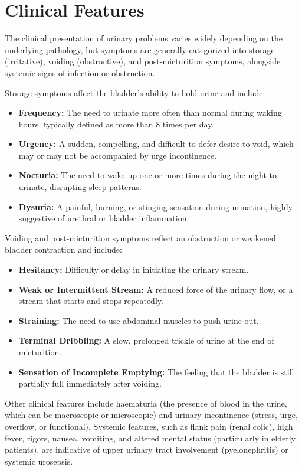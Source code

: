 \section*{Clinical Features}
The clinical presentation of urinary problems varies widely depending on the underlying pathology, but symptoms are generally categorized into storage (irritative), voiding (obstructive), and post-micturition symptoms, alongside systemic signs of infection or obstruction.

Storage symptoms affect the bladder's ability to hold urine and include:
\begin{itemize}
    \item \textbf{Frequency:} The need to urinate more often than normal during waking hours, typically defined as more than 8 times per day.
    \item \textbf{Urgency:} A sudden, compelling, and difficult-to-defer desire to void, which may or may not be accompanied by urge incontinence.
    \item \textbf{Nocturia:} The need to wake up one or more times during the night to urinate, disrupting sleep patterns.
    \item \textbf{Dysuria:} A painful, burning, or stinging sensation during urination, highly suggestive of urethral or bladder inflammation.
\end{itemize}

Voiding and post-micturition symptoms reflect an obstruction or weakened bladder contraction and include:
\begin{itemize}
    \item \textbf{Hesitancy:} Difficulty or delay in initiating the urinary stream.
    \item \textbf{Weak or Intermittent Stream:} A reduced force of the urinary flow, or a stream that starts and stops repeatedly.
    \item \textbf{Straining:} The need to use abdominal muscles to push urine out.
    \item \textbf{Terminal Dribbling:} A slow, prolonged trickle of urine at the end of micturition.
    \item \textbf{Sensation of Incomplete Emptying:} The feeling that the bladder is still partially full immediately after voiding.
\end{itemize}

Other clinical features include haematuria (the presence of blood in the urine, which can be macroscopic or microscopic) and urinary incontinence (stress, urge, overflow, or functional). Systemic features, such as flank pain (renal colic), high fever, rigors, nausea, vomiting, and altered mental status (particularly in elderly patients), are indicative of upper urinary tract involvement (pyelonephritis) or systemic urosepsis.

